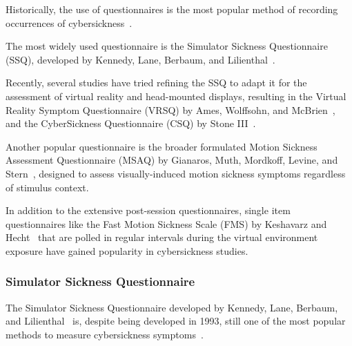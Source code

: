 Historically, the use of questionnaires is the most popular method of recording occurrences of
cybersickness~\cite{Rebenitsch2016,Saredakis2020}.

The most widely used questionnaire is the Simulator Sickness Questionnaire (SSQ), developed by Kennedy, Lane, Berbaum,
and Lilienthal~\cite{Kennedy1993}.

Recently, several studies have tried refining the SSQ to adapt it for the assessment of virtual reality and
head-mounted displays, resulting in the Virtual Reality Symptom Questionnaire (VRSQ) by Ames, Wolffsohn, and
McBrien~\cite{Ames2005}, and the CyberSickness Questionnaire (CSQ) by Stone III~\cite{Stone2017}.

Another popular questionnaire is the broader formulated Motion Sickness Assessment Questionnaire (MSAQ) by Gianaros,
Muth, Mordkoff, Levine, and Stern~\cite{Gianaros2001}, designed to assess visually-induced motion sickness symptoms
regardless of stimulus context.

In addition to the extensive post-session questionnaires, single item questionnaires like the Fast Motion Sickness
Scale (FMS) by Keshavarz and Hecht~\cite{Keshavarz2011} that are polled in regular intervals during the virtual
environment exposure have gained popularity in cybersickness studies.


\subsubsection{Simulator Sickness Questionnaire}\label{subsubsec:simulator-sickness-questionnaire}

The Simulator Sickness Questionnaire developed by Kennedy, Lane, Berbaum, and Lilienthal~\cite{Kennedy1993} is,
despite being developed in 1993, still one of the most popular methods to measure cybersickness
symptoms~\cite{Saredakis2020}.

